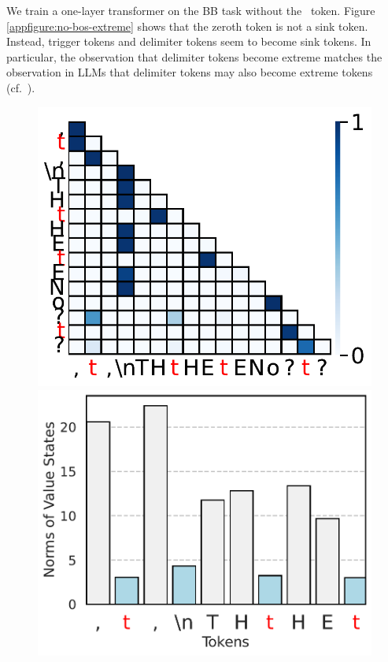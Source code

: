 We train a one-layer transformer on the BB task without the \bos~token. Figure \ref{appfigure:no-bos-extreme} shows that the zeroth token is not a sink token. Instead, trigger tokens and delimiter tokens seem to become sink tokens. In particular, the observation that delimiter tokens become extreme matches the observation in LLMs that delimiter tokens may also become extreme tokens (cf.\ ). 
\begin{figure}[h]
  \centering
  \begin{minipage}{0.35\textwidth}
      \centering
      \vspace{-.2em}
      \includegraphics[width=0.9\linewidth]{Figures/BBM_appendix/no_bos_attn_fig0.pdf}
  \end{minipage}
  \begin{minipage}{0.35\textwidth}
      \centering
      \vspace{-.2em}
      \includegraphics[width=\linewidth]{Figures/BBM_appendix/no_bos_value_states_layer_0.pdf}

\end{minipage}
\end{figure}
